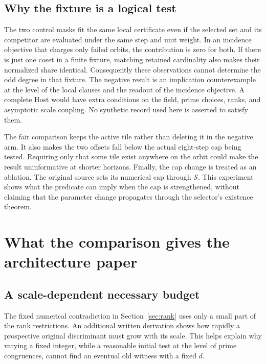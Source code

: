 \documentclass[12pt,letterpaper]{article}
\DeclareRobustCommand{\id}[1]{\mbox{\small\ttfamily #1}}
\begin{document}
\subsection{Why the fixture is a logical test}

The two control masks fit the same local certificate even if the selected set and its competitor are evaluated under the same step and unit weight. In an incidence objective that charges only failed orbits, the contribution is zero for both. If there is just one coset in a finite fixture, matching retained cardinality also makes their normalized share identical. Consequently these observations cannot determine the odd degree in that fixture. The negative result is an implication counterexample at the level of the local clauses and the readout of the incidence objective. A complete \id{Host} would have extra conditions on the field, prime choices, ranks, and asymptotic scale coupling. No synthetic record used here is asserted to satisfy them.

The fair comparison keeps the active tile rather than deleting it in the negative arm. It also makes the two offsets fall below the actual eight-step cap being tested. Requiring only that some tile exist anywhere on the orbit could make the result uninformative at shorter horizons. Finally, the cap change is treated as an ablation. The original source sets its numerical cap through $\mathcal S$. This experiment shows what the predicate can imply when the cap is strengthened, without claiming that the parameter change propagates through the selector's existence theorem.

\section{What the comparison gives the architecture paper}

\subsection{A scale-dependent necessary budget}

The fixed numerical contradiction in Section~\ref{sec:rank} uses only a small part of the rank restrictions. An additional written derivation shows how rapidly a prospective original discriminant must grow with its scale. This helps explain why varying a fixed integer, while a reasonable initial test at the level of prime congruences, cannot find an eventual old witness with a fixed $d$.
\end{document}

